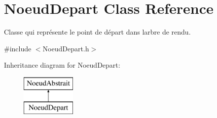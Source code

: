 \hypertarget{class_noeud_depart}{}\section{Noeud\+Depart Class Reference}
\label{class_noeud_depart}


Classe qui représente le point de départ dans l\textquotesingle{}arbre de rendu.  




{\ttfamily \#include $<$Noeud\+Depart.\+h$>$}

Inheritance diagram for Noeud\+Depart\+:\begin{figure}[H]
\begin{center}
\leavevmode
\includegraphics[height=2.000000cm]{class_noeud_depart}
\end{center}
\end{figure}
